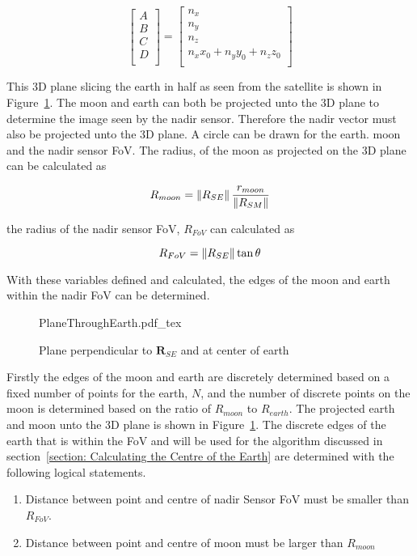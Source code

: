 \begin{equation}
\begin{bmatrix}
	A\\
	B\\
	C\\
	D\\
\end{bmatrix} = \begin{bmatrix}
n_x\\
n_y\\
n_z\\
n_xx_0 + n_yy_0 + n_zz_0\\
\end{bmatrix}
\end{equation}

This 3D plane slicing the earth in half as seen from the satellite is shown in Figure~\ref{fig:PlaneThroughEarth}. The moon and earth can both be projected unto the 3D plane to determine the image seen by the nadir sensor. Therefore the nadir vector must also be projected unto the 3D plane. A circle can be drawn for the earth. moon and the nadir sensor FoV. The radius, of the moon as projected on the 3D plane can be calculated as 

\begin{equation}
	R_{moon} = \left\lVert R_{SE}\right\rVert \frac{r_{moon}}{\left\lVert R_{SM}\right\rVert}
\end{equation}

the radius of the nadir sensor FoV, $R_{FoV}$ can calculated as 

\begin{equation}
	R_{FoV} = \left\lVert R_{SE}\right\rVert \tan \theta
\end{equation}

With these variables defined and calculated, the edges of the moon and earth within the nadir FoV can be determined.


\begin{figure}[!hbt]
	\centering
	\def\svgwidth{14cm}
	{PlaneThroughEarth.pdf_tex}
	\caption{Plane perpendicular to $\mathbf{R}_{SE}$ and at center of earth}
	\label{fig:PlaneThroughEarth}
\end{figure}

Firstly the edges of the moon and earth are discretely determined based on a fixed number of points for the earth, $N$, and the number of discrete points on the moon is determined based on the ratio of $R_{moon}$ to $R_{earth}$. The projected earth and moon unto the 3D plane is shown in Figure~\ref{fig:PlaneThroughEarth}. The discrete edges of the earth that is within the FoV and will be used for the algorithm discussed in section~\ref{section: Calculating the Centre of the Earth} are determined with the following logical statements.
\begin{enumerate}
	\item Distance between point and centre of nadir Sensor FoV must be smaller than $R_{FoV}$.
	\item Distance between point and centre of moon must be larger than $R_{moon}$
\end{enumerate}

